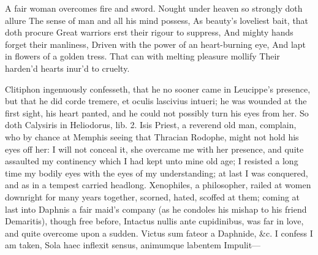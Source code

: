 {A fair woman overcomes fire and sword.
Nought under heaven so strongly doth allure
The sense of man and all his mind possess,
As beauty's loveliest bait, that doth procure
Great warriors erst their rigour to suppress,
And mighty hands forget their manliness,
Driven with the power of an heart-burning eye,
And lapt in flowers of a golden tress.
That can with melting pleasure mollify
Their harden'd hearts inur'd to cruelty.

Clitiphon ingenuously confesseth, that he no sooner came in
Leucippe's presence, but that he did corde tremere, et oculis lascivius
intueri; he was wounded at the first sight, his heart panted, and
he could not possibly turn his eyes from her. So doth Calysiris in
Heliodorus, lib. 2. Isis Priest, a reverend old man, complain, who by
chance at Memphis seeing that Thracian Rodophe, might not hold his eyes
off her: I will not conceal it, she overcame me with her
presence, and quite assaulted my continency which I had kept unto mine
old age; I resisted a long time my bodily eyes with the eyes of my
understanding; at last I was conquered, and as in a tempest carried
headlong.  Xenophiles, a philosopher, railed at women downright
for many years together, scorned, hated, scoffed at them; coming at
last into Daphnis a fair maid's company (as he condoles his mishap to
his friend Demaritis), though free before, Intactus nullis ante
cupidinibus, was far in love, and quite overcome upon a sudden. Victus
sum fateor a Daphnide, \&c. I confess I am taken,
Sola haec inflexit sensus, animumque labentem
Impulit---

}

